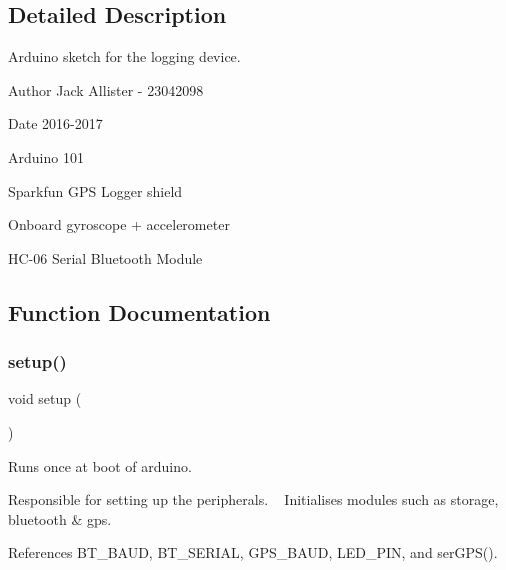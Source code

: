 \subsection{Detailed Description}
Arduino sketch for the logging device. 

\begin{DoxyAuthor}{Author}
Jack Allister -\/ 23042098 
\end{DoxyAuthor}
\begin{DoxyDate}{Date}
2016-\/2017
\begin{DoxyItemize}
\item Arduino 101
\item Sparkfun G\+PS Logger shield
\item Onboard gyroscope + accelerometer
\item H\+C-\/06 Serial Bluetooth Module 
\end{DoxyItemize}
\end{DoxyDate}


\subsection{Function Documentation}
\mbox{\label{logging-device_8ino_a4fc01d736fe50cf5b977f755b675f11d}} 
\subsubsection{\texorpdfstring{setup()}{setup()}}
{\footnotesize\ttfamily void setup (\begin{DoxyParamCaption}{ }\end{DoxyParamCaption})}



Runs once at boot of arduino. 

Responsible for setting up the peripherals. ~\newline
Initialises modules such as storage, bluetooth \& gps. 

References B\+T\+\_\+\+B\+A\+UD, B\+T\+\_\+\+S\+E\+R\+I\+AL, G\+P\+S\+\_\+\+B\+A\+UD, L\+E\+D\+\_\+\+P\+IN, and ser\+G\+P\+S().


